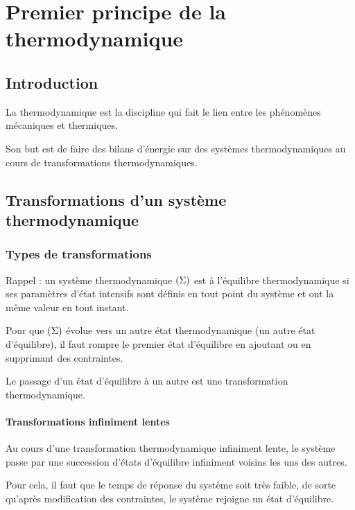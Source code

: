 \chapter{Premier principe de la thermodynamique}\label{chap:premierPrincipe}

\minitoc

\section*{Introduction}

La thermodynamique est la discipline qui fait le lien entre les phénomènes mécaniques et thermiques.

Son but est de faire des bilans d'énergie sur des systèmes thermodynamiques au cours de transformations thermodynamiques.

\section{Transformations d'un système thermodynamique}

\subsection{Types de transformations}

Rappel : un système thermodynamique \(\left(\Sigma\right)\) est à l'équilibre thermodynamique si ses paramètres d'état intensifs sont définis en tout point du système et ont la même valeur en tout instant.

Pour que \(\left(\Sigma\right)\) évolue vers un autre état thermodynamique (\ie un autre état d'équilibre), il faut rompre le premier état d'équilibre en ajoutant ou en supprimant des contraintes.

Le passage d'un état d'équilibre à un autre est une transformation thermodynamique.

\subsubsection{Transformations infiniment lentes}

Au cours d'une transformation thermodynamique infiniment lente, le système passe par une succession d'états d'équilibre infiniment voisins les uns des autres.

Pour cela, il faut que le temps de réponse du système soit très faible, de sorte qu'après modification des contraintes, le système rejoigne un état d'équilibre.

